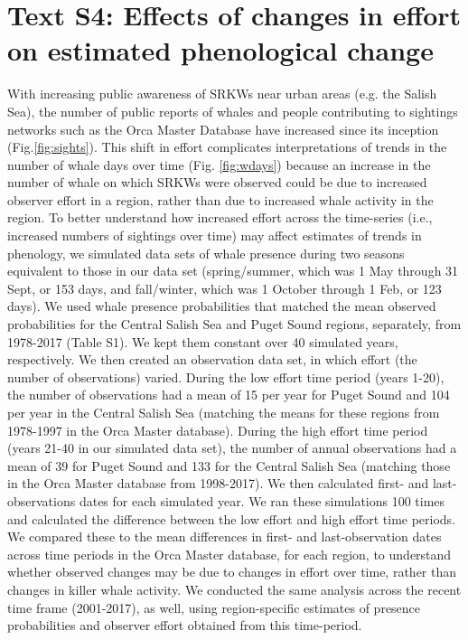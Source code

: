 \documentclass{article}
\begin{document}
\section* {Text S4: Effects of changes in effort on estimated phenological change}
With increasing public awareness of SRKWs near urban areas (e.g. the Salish Sea), the number of public reports of whales and people contributing to sightings networks such as the Orca Master Database have increased since its inception (Fig.\ref{fig:sights}). This shift in effort complicates interpretations of trends in the number of whale days over time (Fig. \ref{fig:wdays}) because an increase in the number of whale on which SRKWs were observed could be due to increased observer effort in a region, rather than due to increased whale activity in the region. To better understand how increased effort across the time-series (i.e., increased numbers of sightings over time) may affect estimates of trends in phenology, we simulated data sets of whale presence during two seasons equivalent to those in our data set (spring/summer, which was 1 May through 31 Sept, or 153 days, and fall/winter, which was 1 October through 1 Feb, or 123 days). We used whale presence probabilities that matched the mean observed probabilities for the Central Salish Sea and Puget Sound regions, separately, from 1978-2017 (Table S1). We kept them constant over 40 simulated years, respectively. We then created an observation data set, in which effort (the number of observations) varied. During the low effort time period (years 1-20), the number of observations had a mean of 15 per year for Puget Sound and 104 per year in the Central Salish Sea (matching the means for these regions from 1978-1997 in the Orca Master database). During the high effort time period (years 21-40 in our simulated data set), the number of annual observations had a mean of 39 for Puget Sound and 133 for the Central Salish Sea (matching those in the Orca Master database from 1998-2017). We then calculated first- and last- observations dates for each simulated year. We ran these simulations 100 times and calculated the difference between the low effort and high effort time periods. We compared these to the mean differences in first- and last-observation dates across time periods in the Orca Master database, for each region, to understand whether observed changes may be due to changes in effort over time, rather than changes in killer whale activity. We conducted the same analysis across the recent time frame (2001-2017), as well, using region-specific estimates of presence probabilities and observer effort obtained from this time-period.
\end{document}
